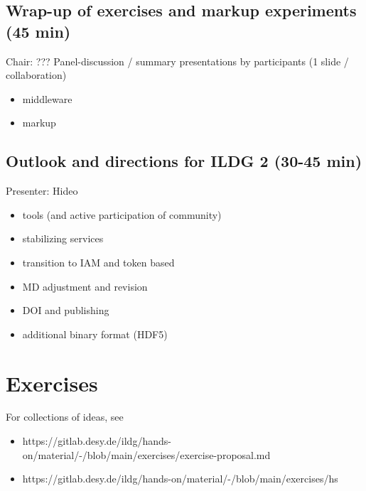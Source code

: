 \documentclass{article}
\begin{document}
\subsection{Wrap-up of exercises and markup experiments (45 min)}
Chair: ???
Panel-discussion / summary presentations by participants (1 slide / collaboration)
\begin{itemize}
    \item middleware
    \item markup
\end{itemize}

\subsection{Outlook and directions for ILDG 2 (30-45 min)}
Presenter: Hideo
\begin{itemize}
    \item tools (and active participation of community)
    \item stabilizing services
    \item transition to IAM and token based
    \item MD adjustment and revision
    \item DOI and publishing
    \item additional binary format (HDF5)
\end{itemize}


\section{Exercises}
For collections of ideas, see
\begin{itemize}
    \item https://gitlab.desy.de/ildg/hands-on/material/-/blob/main/exercises/exercise-proposal.md
    \item https://gitlab.desy.de/ildg/hands-on/material/-/blob/main/exercises/hs
\end{itemize}
\end{document}

